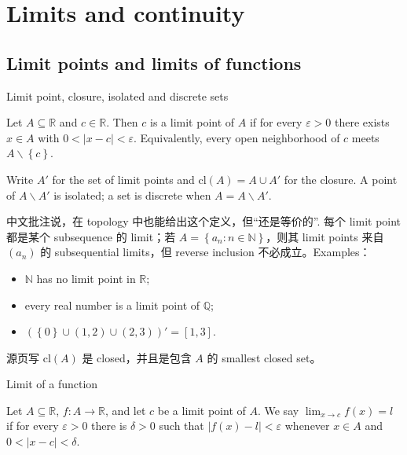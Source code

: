 \chapter{Limits and continuity}

\section{Limit points and limits of functions}

\begin{definition}{Limit point, closure, isolated and discrete sets}

Let \(A \subseteq \mathbb{R}\) and \(c \in \mathbb{R}\). Then \(c\) is a limit point of \(A\) if for every \(\varepsilon > 0\) there exists \(x \in A\) with \(0 < \left| {x - c} \right| < \varepsilon\). Equivalently, every open neighborhood of \(c\) meets \(A \smallsetminus \left\{ c \right\}\).

Write \(A'\) for the set of limit points and \(\text{cl}(A) = A \cup A'\) for the closure. A point of \(A \smallsetminus A'\) is isolated; a set is discrete when \(A = A \smallsetminus A'\).

\end{definition}

中文批注说，在 topology 中也能给出这个定义，但``还是等价的''. 每个 limit point 都是某个 subsequence 的 limit；若 \(A = \left\{ {a_{n}:n \in \mathbb{N}} \right\}\)，则其 limit points 来自 \(\left( a_{n} \right)\) 的 subsequential limits，但 reverse inclusion 不必成立。Examples：

\begin{itemize}
\tightlist
\item
  \(\mathbb{N}\) has no limit point in \(\mathbb{R}\);
\item
  every real number is a limit point of \(\mathbb{Q}\);
\item
  \(\left( {\left\{ 0 \right\} \cup \left( {1,2} \right) \cup \left( {2,3} \right)} \right)' = \left\lbrack {1,3} \right\rbrack\).
\end{itemize}

源页写 \(\text{cl}(A)\) 是 closed，并且是包含 \(A\) 的 smallest closed set。

\begin{definition}{Limit of a function}

Let \(A \subseteq \mathbb{R}\), \(f:A\rightarrow\mathbb{R}\), and let \(c\) be a limit point of \(A\). We say \(\lim_{x\rightarrow c}f(x) = l\) if for every \(\varepsilon > 0\) there is \(\delta > 0\) such that \(\left| {f(x) - l} \right| < \varepsilon\) whenever \(x \in A\) and \(0 < \left| {x - c} \right| < \delta\).

\end{definition}

